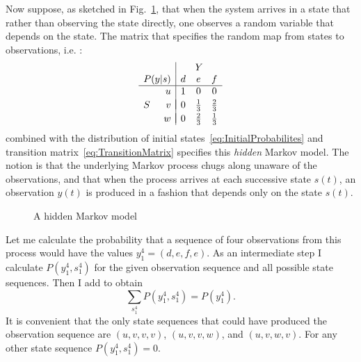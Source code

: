 \documentclass[]{article}
\newcommand{\ts}[3]{#1_{#2}^{#3}}                    %
\newcommand{\ti}[2]{{#1}{(#2)}}                  %
\newcommand{\ie}{i.e.\xspace}
\newcommand{\plotsize}{%
  \fontsize{9}{9}%
  \selectfont}
\renewcommand{\comment}[1]{}
\newcommand*{\inputfig}[2]{}
\newcommand*{\InputIntroductionFig}[1]{\inputfig{../../figs/introduction}{#1}}
\begin{document}
%
Now suppose, as sketched in Fig.~\ref{fig:dhmm}, that when the system
arrives in a state that rather than observing the state directly, one
observes a random variable that depends on the state.  The matrix that
specifies the random map from states to observations, \ie%
:
\begin{equation*}
  \begin{array}{cr|ccc}
      &      &\multicolumn{3}{c}{Y} \\
      \multicolumn{2}{r|}{P(y|s)} & d & e           & f \\ %
      \hline%
      & u      & 1 & 0           & 0 \\
      &        & \vspace{-1 em} \\
    S & v      & 0 & \frac{1}{3} & \frac{2}{3} \\
      &        & \vspace{-1 em} \\
      & w      & 0 & \frac{2}{3} & \frac{1}{3}
  \end{array}%
\end{equation*}
combined with the distribution of initial
states~\eqref{eq:InitialProbabilites} and transition
matrix~\eqref{eq:TransitionMatrix} specifies this \emph{hidden} Markov
model.  The notion is that the underlying Markov process chugs along
unaware of the observations, and that when the process arrives at each
successive state $\ti{s}{t}$, an observation $\ti{y}{t}$ is produced
in a fashion that depends only on the state $\ti{s}{t}$.

\begin{figure}[htbp]
  \centering{\plotsize%
    \InputIntroductionFig{Markov_dhmm}
  }
  \caption[\comment{fig:Markov_dhmm }A hidden Markov model.]{A hidden
    Markov model}\label{fig:dhmm}
\end{figure}

Let me calculate the probability that a sequence of four observations
from this process would have the values $\ts{y}{1}{4} = (d,e,f,e)$.
As an intermediate step I calculate $P(\ts{y}{1}{4},\ts{s}{1}{4})$
for the given observation sequence and all possible state sequences.
Then I add to obtain
\begin{equation}
  \label{eq:dhmm_sum}
  \sum_{\ts{s}{1}{4}} P(\ts{y}{1}{4},\ts{s}{1}{4}) = P(\ts{y}{1}{4}).
\end{equation}
It is convenient that the only state sequences that could have
produced the observation sequence are $(u,v,v,v)$, $(u,v,v,w)$, and
$(u,v,w,v)$.  For any other state sequence
$P(\ts{y}{1}{4},\ts{s}{1}{4}) = 0$.
\end{document}
